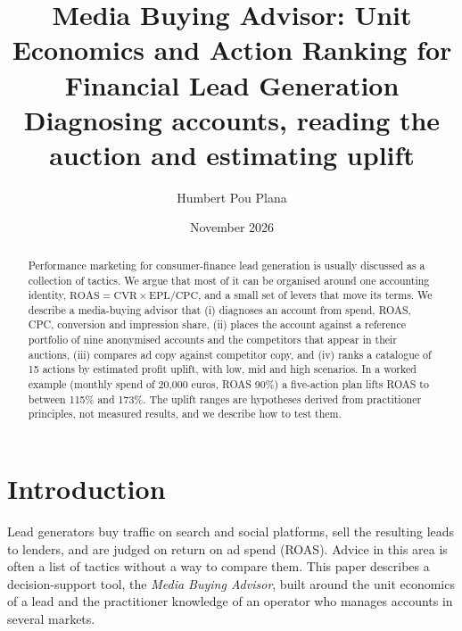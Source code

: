 \documentclass[10pt,a4paper]{article}
\begin{document}
\title{\bfseries Media Buying Advisor: Unit Economics and Action Ranking for Financial Lead Generation\\[2pt]\large Diagnosing accounts, reading the auction and estimating uplift}
\author{Humbert Pou Plana}
\date{November 2026}
\maketitle
\begin{abstract}
Performance marketing for consumer-finance lead generation is usually discussed as a collection of tactics. We argue that most of it can be organised around one accounting identity, $\mathrm{ROAS}=\mathrm{CVR}\times \mathrm{EPL}/\mathrm{CPC}$, and a small set of levers that move its terms. We describe a media-buying advisor that (i) diagnoses an account from spend, ROAS, CPC, conversion and impression share, (ii) places the account against a reference portfolio of nine anonymised accounts and the competitors that appear in their auctions, (iii) compares ad copy against competitor copy, and (iv) ranks a catalogue of 15 actions by estimated profit uplift, with low, mid and high scenarios. In a worked example (monthly spend of 20{,}000 euros, ROAS 90\%) a five-action plan lifts ROAS to between 115\% and 173\%. The uplift ranges are hypotheses derived from practitioner principles, not measured results, and we describe how to test them.
\end{abstract}

\section{Introduction}
Lead generators buy traffic on search and social platforms, sell the resulting leads to lenders, and are judged on return on ad spend (ROAS). Advice in this area is often a list of tactics without a way to compare them. This paper describes a decision-support tool, the \emph{Media Buying Advisor}, built around the unit economics of a lead and the practitioner knowledge of an operator who manages accounts in several markets.
\end{document}
